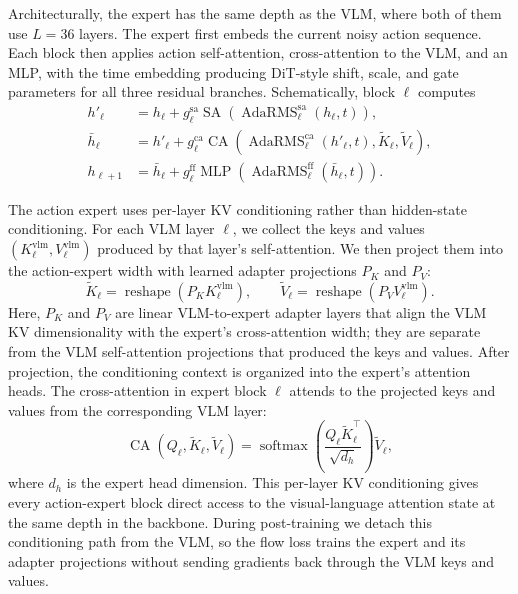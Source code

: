 Architecturally, the expert has the same depth as the VLM, where both of them use \(L=36\) layers. The expert first embeds the current noisy action sequence. Each block then applies action self-attention, cross-attention to the VLM, and an MLP, with the time embedding producing DiT-style shift, scale, and gate parameters for all three residual branches. Schematically, block \(\ell\) computes
\begin{align}
    h'_\ell
        &= h_\ell + g^{\mathrm{sa}}_\ell
        \operatorname{SA}\!\left(\operatorname{AdaRMS}^{\mathrm{sa}}_\ell(h_\ell,t)\right), \\
    \bar{h}_\ell
        &= h'_\ell + g^{\mathrm{ca}}_\ell
        \operatorname{CA}\!\left(
            \operatorname{AdaRMS}^{\mathrm{ca}}_\ell(h'_\ell,t),
            \tilde{K}_\ell,
            \tilde{V}_\ell
        \right), \\
    h_{\ell+1}
        &= \bar{h}_\ell + g^{\mathrm{ff}}_\ell
        \operatorname{MLP}\!\left(\operatorname{AdaRMS}^{\mathrm{ff}}_\ell(\bar{h}_\ell,t)\right).
\end{align}

The action expert uses per-layer KV conditioning rather than hidden-state conditioning. For each VLM layer \(\ell\), we collect the keys and values \((K^{\mathrm{vlm}}_\ell,V^{\mathrm{vlm}}_\ell)\) produced by that layer's self-attention. We then project them into the action-expert width with learned adapter projections \(P_K\) and \(P_V\):
\begin{equation}
    \tilde{K}_\ell =
    \operatorname{reshape}\!\left(P_K K^{\mathrm{vlm}}_\ell\right),
    \qquad
    \tilde{V}_\ell =
    \operatorname{reshape}\!\left(P_V V^{\mathrm{vlm}}_\ell\right).
\end{equation}
Here, \(P_K\) and \(P_V\) are linear VLM-to-expert adapter layers that align the VLM KV dimensionality with the expert's cross-attention width; they are separate from the VLM self-attention projections that produced the keys and values. After projection, the conditioning context is organized into the expert's attention heads. The cross-attention in expert block \(\ell\) attends to the projected keys and values from the corresponding VLM layer:
\begin{equation}
    \operatorname{CA}(Q_\ell,\tilde{K}_\ell,\tilde{V}_\ell)
    =
    \operatorname{softmax}\!\left(
        \frac{Q_\ell \tilde{K}_\ell^\top}{\sqrt{d_h}}
    \right)\tilde{V}_\ell,
\end{equation}
where \(d_h\) is the expert head dimension. This per-layer KV conditioning gives every action-expert block direct access to the visual-language attention state at the same depth in the backbone. During post-training we detach this conditioning path from the VLM, so the flow loss trains the expert and its adapter projections without sending gradients back through the VLM keys and values.


